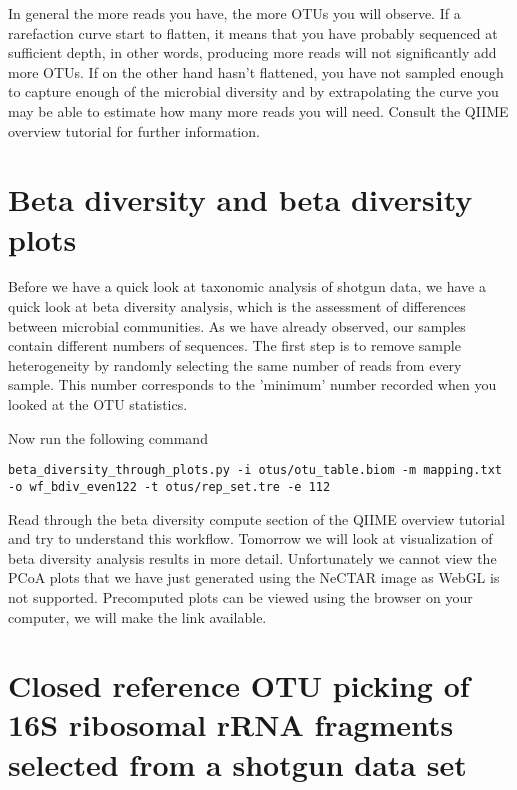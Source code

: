 In general the more reads you have, the more OTUs you will observe. If a rarefaction curve start to flatten, it means that you have probably sequenced at sufficient depth, in other words, producing more reads will not significantly add more OTUs. If on the other hand hasn't flattened, you have not sampled enough to capture enough of the microbial diversity and by extrapolating the curve you may be able to estimate how many more reads you will need. Consult the QIIME overview tutorial for further information.

\section{Beta diversity and beta diversity plots}

Before we have a quick look at taxonomic analysis of shotgun data, we have a quick look at beta diversity analysis, which is the assessment of differences between microbial communities. As we have already observed, our samples contain different numbers of sequences. 
The first step is to remove sample heterogeneity by randomly selecting the same number of reads from every sample. This number corresponds to the 'minimum' number recorded when you looked at the OTU statistics. 

\begin{steps}
Now run the following command
\begin{lstlisting}
beta_diversity_through_plots.py -i otus/otu_table.biom -m mapping.txt -o wf_bdiv_even122 -t otus/rep_set.tre -e 112

\end{lstlisting}
\end{steps}

Read through the beta diversity compute section of the QIIME overview tutorial and try to understand this workflow. Tomorrow we will look at visualization of beta diversity analysis results in more detail. Unfortunately we cannot view the PCoA plots that we have just generated using the NeCTAR image as WebGL is not supported. Precomputed plots can be viewed using the browser on your computer, we will make the link available.

\section{Closed reference OTU picking of 16S ribosomal rRNA fragments selected from a shotgun data set}


